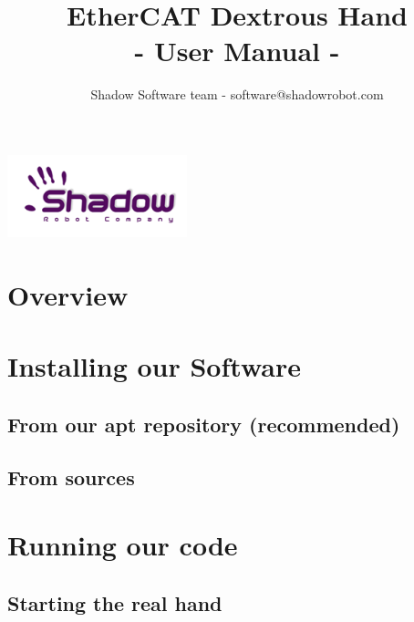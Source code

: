 \documentclass{article}
\title{\textbf{EtherCAT Dextrous Hand} \\
- User Manual -}
\author{Shadow Software team - software@shadowrobot.com}
\begin{document}
\begin{titlepage}

\maketitle
\vspace{5cm}
\begin{center}
\includegraphics{images/logo-shadowDB.png}
\end{center}
\end{titlepage}

\tableofcontents
\newpage

\section{Overview}
\label{sec:overview}

\newpage

\section{Installing our Software}
\label{sec:install}

\newpage

\subsection{From our apt repository (recommended)}
\label{sec:install_apt}

\newpage

\subsection{From sources}
\label{sec:install_src}

\newpage

\section{Running our code}
\label{sec:running-our-code}

\newpage

\subsection{Starting the real hand}
\label{sec:starting-real-hand}
\end{document}
